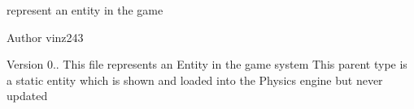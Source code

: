 represent an entity in the game

\begin{DoxyAuthor}{Author}
vinz243 
\end{DoxyAuthor}
\begin{DoxyVersion}{Version}
0.. This file represents an Entity in the game system This parent type is a static entity which is shown and loaded into the Physics engine but never updated 
\end{DoxyVersion}
